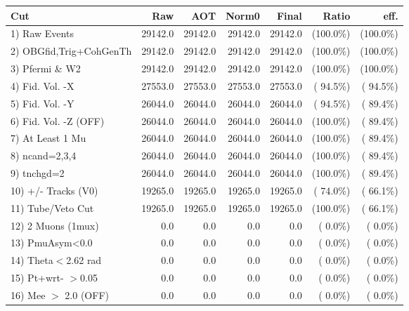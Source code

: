  \begin{table}[h!]\centering
 \begin{tabular}{||l||r|r|r|r|r|r||}
 \hline
 \hline
 Cut & Raw & AOT & Norm0 & Final & Ratio & eff.       \\
 \hline
  1) Raw Events           &      29142.0 &      29142.0 &      29142.0 &      29142.0 & (100.0\%) & (100.0\%) \\
  2) OBGfid,Trig+CohGenTh &      29142.0 &      29142.0 &      29142.0 &      29142.0 & (100.0\%) & (100.0\%) \\
  3) Pfermi \& W2         &      29142.0 &      29142.0 &      29142.0 &      29142.0 & (100.0\%) & (100.0\%) \\
  4) Fid. Vol. -X         &      27553.0 &      27553.0 &      27553.0 &      27553.0 & ( 94.5\%) & ( 94.5\%) \\
  5) Fid. Vol. -Y         &      26044.0 &      26044.0 &      26044.0 &      26044.0 & ( 94.5\%) & ( 89.4\%) \\
  6) Fid. Vol. -Z (OFF)   &      26044.0 &      26044.0 &      26044.0 &      26044.0 & (100.0\%) & ( 89.4\%) \\
  7) At Least 1 Mu        &      26044.0 &      26044.0 &      26044.0 &      26044.0 & (100.0\%) & ( 89.4\%) \\
  8) ncand=2,3,4          &      26044.0 &      26044.0 &      26044.0 &      26044.0 & (100.0\%) & ( 89.4\%) \\
  9) tnchgd=2             &      26044.0 &      26044.0 &      26044.0 &      26044.0 & (100.0\%) & ( 89.4\%) \\
 10) +/- Tracks (V0)      &      19265.0 &      19265.0 &      19265.0 &      19265.0 & ( 74.0\%) & ( 66.1\%) \\
 11) Tube/Veto Cut        &      19265.0 &      19265.0 &      19265.0 &      19265.0 & (100.0\%) & ( 66.1\%) \\
 12) 2 Muons (1mux)       &          0.0 &          0.0 &          0.0 &          0.0 & (  0.0\%) & (  0.0\%) \\
 13) PmuAsym<0.0          &          0.0 &          0.0 &          0.0 &          0.0 & (  0.0\%) & (  0.0\%) \\
 14) Theta$<$2.62 rad     &          0.0 &          0.0 &          0.0 &          0.0 & (  0.0\%) & (  0.0\%) \\
 15) Pt+wrt- $>$0.05      &          0.0 &          0.0 &          0.0 &          0.0 & (  0.0\%) & (  0.0\%) \\
 16) Mee $>$ 2.0  (OFF)   &          0.0 &          0.0 &          0.0 &          0.0 & (  0.0\%) & (  0.0\%) \\

\end{tabular}
\end{table}
